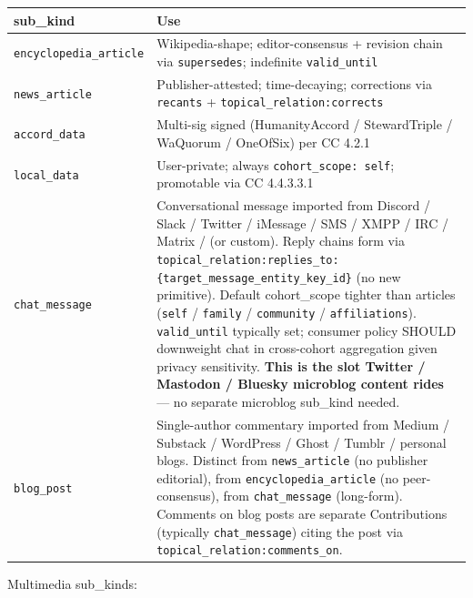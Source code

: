 \documentclass[11pt]{article}
\begin{document}
{\footnotesize
\begin{longtable}{|p{8.0cm}|p{8.0cm}|}\hline
\textbf{sub\_kind} & \textbf{Use} \\ \hline\endhead
\texttt{encyclopedia\_article} & Wikipedia-shape; editor-consensus + revision chain via \texttt{supersedes}; indefinite \texttt{valid\_until} \\ \hline
\texttt{news\_article} & Publisher-attested; time-decaying; corrections via \texttt{recants} + \texttt{topical\_relation:corrects} \\ \hline
\texttt{accord\_data} & Multi-sig signed (HumanityAccord / StewardTriple / WaQuorum / OneOfSix) per CC 4.2.1 \\ \hline
\texttt{local\_data} & User-private; always \texttt{cohort\_scope: self}; promotable via CC 4.4.3.3.1 \\ \hline
\texttt{chat\_message} & Conversational message imported from Discord / Slack / Twitter / iMessage / SMS / XMPP / IRC / Matrix / (or custom). Reply chains form via \texttt{topical\_relation:replies\_to:\{target\_message\_entity\_key\_id\}} (no new primitive). Default cohort\_scope tighter than articles (\texttt{self} / \texttt{family} / \texttt{community} / \texttt{affiliations}). \texttt{valid\_until} typically set; consumer policy SHOULD downweight chat in cross-cohort aggregation given privacy sensitivity. \textbf{This is the slot Twitter / Mastodon / Bluesky microblog content rides} — no separate microblog sub\_kind needed. \\ \hline
\texttt{blog\_post} & Single-author commentary imported from Medium / Substack / WordPress / Ghost / Tumblr / personal blogs. Distinct from \texttt{news\_article} (no publisher editorial), from \texttt{encyclopedia\_article} (no peer-consensus), from \texttt{chat\_message} (long-form). Comments on blog posts are separate Contributions (typically \texttt{chat\_message}) citing the post via \texttt{topical\_relation:comments\_on}. \\ \hline
\end{longtable}}


Multimedia sub\_kinds:
\end{document}
